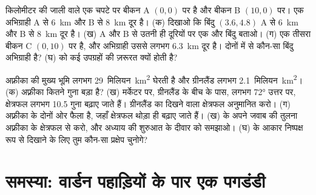 \begin{exercise}[$\star\star\star$]\label{exo:g9:maps-of-the-earth:11}
किलोमीटर की जाली वाले एक चपटे  पर बीकन A $(0, 0)$ पर है और बीकन B
$(10, 0)$ पर। एक अभिग्राही A से \qty{6}{km} और B से \qty{8}{km}
दूर है। (क) दिखाओ कि बिंदु $(3.6, 4.8)$ A से \qty{6}{km} और B से
\qty{8}{km} दूर है। (ख) A और B से उतनी ही दूरियों पर एक और बिंदु बताओ। (ग) एक तीसरा
बीकन C $(0, 10)$ पर है, और अभिग्राही उससे लगभग \qty{6.3}{km} दूर है। दोनों में से
कौन-सा बिंदु अभिग्राही है? (घ)  को कई उपग्रहों की ज़रूरत क्यों होती
है?
\end{exercise}

\begin{exercise}[$\star\star\star$]\label{exo:g9:maps-of-the-earth:12}
अफ़्रीका की मुख्य भूमि लगभग 29~मिलियन~\unit{km^2} घेरती है और ग्रीनलैंड लगभग
2.1~मिलियन~\unit{km^2}। (क) अफ़्रीका कितने गुना बड़ा है? (ख) मर्केटर  पर,
ग्रीनलैंड के बीच के पास, लगभग \ang{72} उत्तर पर, क्षेत्रफल लगभग 10.5 गुना बढ़ाए जाते हैं।
ग्रीनलैंड का दिखने वाला क्षेत्रफल अनुमानित करो। (ग) अफ़्रीका  के दोनों ओर फैला है,
जहाँ क्षेत्रफल थोड़ा ही बढ़ाए जाते हैं। (ख) के अपने जवाब की तुलना अफ़्रीका के क्षेत्रफल से
करो, और अध्याय की शुरुआत के दीवार  को समझाओ। (घ)  के आकार निष्पक्ष रूप
से दिखाने के लिए तुम कौन-सा प्रक्षेप चुनोगे?
\end{exercise}

\section{समस्या: वार्डन पहाड़ियों के पार एक पगडंडी}

